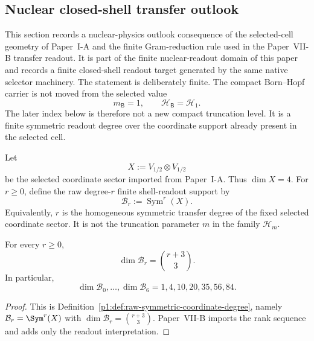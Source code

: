 \documentclass[12pt,a4paper]{article}
\begin{document}
\subsection{Nuclear closed-shell transfer outlook}
\label{p11:app:nuclear-closed-shell-transfer-outlook}

This section records a nuclear-physics outlook consequence of the selected-cell geometry of Paper~I-A and the finite Gram-reduction rule used in the Paper~VII-B transfer readout.  It is part of the finite nuclear-readout domain of this paper and records a finite closed-shell readout target generated by the same native selector machinery.  The statement is deliberately finite.  The compact Born--Hopf carrier is not moved from the selected value
\[
        m_{\mathsf B}=1,
        \qquad
        \mathcal H_{\mathsf B}=\mathcal H_1 .
\]
The later index below is therefore not a new compact truncation level.  It is a finite symmetric readout degree over the coordinate support already present in the selected cell.

\begin{definition}
\label{p11:def:selected-finite-shell-readout-support}
Let
\[
        X:=V_{1/2}\otimes V_{1/2}
\]
be the selected coordinate sector imported from Paper~I-A.  Thus \(\dim X=4\).  For \(r\geq 0\), define the raw degree-\(r\) finite shell-readout support by
\[
        \mathcal B_r:=\operatorname{Sym}^r(X).
\]
Equivalently, \(r\) is the homogeneous symmetric transfer degree of the fixed selected coordinate sector.  It is not the truncation parameter \(m\) in the family \(\mathcal H_m\).
\end{definition}

\begin{lemma}
\label{p11:lem:raw-selected-cell-shell-count}
For every \(r\geq0\),
\[
        \dim \mathcal B_r
        =
        \binom{r+3}{3}.
\]
In particular,
\[
        \dim\mathcal B_0,\ldots,\dim\mathcal B_6
        =
        1,4,10,20,35,56,84.
\]
\end{lemma}

\begin{proof}
This is Definition~\ref{p1:def:raw-symmetric-coordinate-degree}, namely
\(\mathcal B_r=\Sym^r(X)\) with
\(\dim\mathcal B_r=\binom{r+3}{3}\).  Paper~VII-B imports the rank sequence and
adds only the readout interpretation.
\end{proof}
\end{document}
